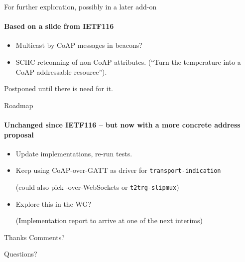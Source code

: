 \documentclass[aspectratio=169,colorlinks]{beamer}
\begin{document}
\begin{frame}{For further exploration, possibly in a later add-on}\Large
	\framesubtitle{Based on a slide from IETF116}

	\begin{itemize}
		\color{gray}
		\item Multicast by CoAP messages in beacons?
		\item SCHC retconning of non-CoAP attributes. (``Turn the temperature into a CoAP addressable resource'').
	\end{itemize}

	\color{black}

	\bigskip

	Postponed until there is need for it.
\end{frame}

\begin{frame}{Roadmap}\Large
	\framesubtitle{Unchanged since IETF116 -- but now with a more concrete address proposal}
	\begin{itemize}
		\item Update implementations, re-run tests.

		\item Keep using CoAP-over-GATT as driver for \texttt{transport-indication}

			(could also pick -over-WebSockets or \texttt{t2trg-slipmux})
		\item Explore this in the WG?

		  (Implementation report to arrive at one of the next interims)
	\end{itemize}
\end{frame}

\begin{frame}{Thanks}\Large
	Comments?

	\bigskip

	Questions?
\end{frame}
\end{document}
